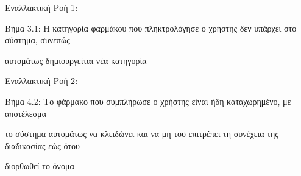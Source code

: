 \documentclass{article}
\begin{document}
 \newpage
 
  \underline{Εναλλακτική Ροή 1}: \vspace{0.005cm} \\
\par Βήμα 3.1: Η κατηγορία φαρμάκου που πληκτρολόγησε ο χρήστης δεν υπάρχει στο σύστημα, συνεπώς \par αυτομάτως δημιουργείται νέα κατηγορία

\vspace{0.3cm}
 
 \underline{Εναλλακτική Ροή 2}: \vspace{0.005cm} \\
\par Βήμα 4.2: Το φάρμακο που συμπλήρωσε ο χρήστης είναι ήδη καταχωρημένο, με αποτέλεσμα \par το σύστημα αυτομάτως να κλειδώνει και να μη του επιτρέπει τη συνέχεια της διαδικασίας εώς ότου \par διορθωθεί το όνομα
\end{document}
